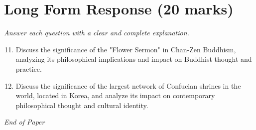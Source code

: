 \documentclass[12pt]{article}
\begin{document}
\section*{Long Form Response (20 marks)}
\textit{Answer each question with a clear and complete explanation.}
\begin{enumerate}[label=\arabic*.]
\setcounter{enumi}{10}
\item Discuss the significance of the "Flower Sermon" in Chan-Zen Buddhism, analyzing its philosophical implications and impact on Buddhist thought and practice.
\item Discuss the significance of the largest network of Confucian shrines in the world, located in Korea, and analyze its impact on contemporary philosophical thought and cultural identity.
\end{enumerate}

\vfill
\noindent\textit{End of Paper}
\end{document}
